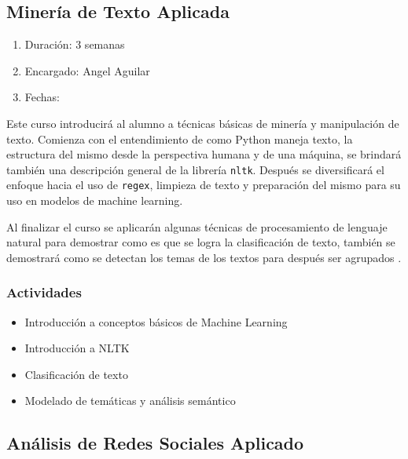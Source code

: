 \documentclass{article}
\begin{document}
        \subsection{Minería de Texto Aplicada}
                
            \begin{enumerate}
                \item Duración: 3 semanas
                \item Encargado: Angel Aguilar
                \item Fechas:
            \end{enumerate}

            Este curso introducirá al alumno a técnicas básicas de minería y manipulación de texto. Comienza con el entendimiento de como Python maneja texto, la estructura del mismo desde la perspectiva humana y de una máquina, se brindará también una descripción general de la librería \texttt{nltk}. Después se diversificará el enfoque hacia el uso de \texttt{regex}, limpieza de texto y preparación del mismo para su uso en modelos de machine learning.

            Al finalizar el curso se aplicarán algunas técnicas de procesamiento de lenguaje natural para demostrar como es que se logra la clasificación de texto, también se demostrará como se detectan los temas de los textos para después ser agrupados \cite{text-mining}.

            \subsubsection{Actividades}
                    
                \begin{itemize}
                    \item Introducción a conceptos básicos de Machine Learning
                    \item Introducción a NLTK
                    \item Clasificación de texto
                    \item Modelado de temáticas y análisis semántico
                \end{itemize}

        \subsection{Análisis de Redes Sociales Aplicado}
\end{document}
